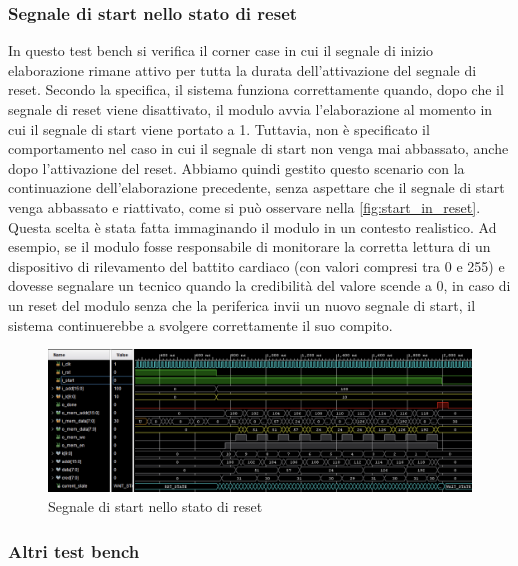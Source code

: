 \documentclass[11pt,a4paper]{article}
\begin{document}
\subsubsection{Segnale di start nello stato di reset}

In questo test bench si verifica il corner case in cui il segnale di inizio elaborazione rimane attivo per tutta la durata dell'attivazione del segnale di reset. Secondo la specifica, il sistema funziona correttamente quando, dopo che il segnale di reset viene disattivato, il modulo avvia l'elaborazione al momento in cui il segnale di start viene portato a 1. Tuttavia, non è specificato il comportamento nel caso in cui il segnale di start non venga mai abbassato, anche dopo l'attivazione del reset. Abbiamo quindi gestito questo scenario con la continuazione dell'elaborazione precedente, senza aspettare che il segnale di start venga abbassato e riattivato, come si può osservare nella \autoref{fig:start_in_reset}. Questa scelta è stata fatta immaginando il modulo in un contesto realistico. Ad esempio, se il modulo fosse responsabile di monitorare la corretta lettura di un dispositivo di rilevamento del battito cardiaco (con valori compresi tra 0 e 255) e dovesse segnalare un tecnico quando la credibilità del valore scende a 0, in caso di un reset del modulo senza che la periferica invii un nuovo segnale di start, il sistema continuerebbe a svolgere correttamente il suo compito.

\vspace{0.5em}

\begin{figure}[htbp]
    \centering
    \includegraphics[width=\textwidth]{resources/start_in_reset.png}
    \caption{Segnale di start nello stato di reset}
    \label{fig:start_in_reset}
\end{figure}

\subsubsection{Altri test bench}
\end{document}
